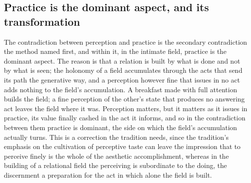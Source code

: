 \subsection{Practice is the dominant aspect, and its transformation}
\label{p22:sub:practice-dominant}

The contradiction between perception and practice is the secondary contradiction the method named first, and within it, in the intimate field, practice is the dominant aspect. The reason is that a relation is built by what is done and not by what is seen; the holonomy of a field accumulates through the acts that send its path the generative way, and a perception however fine that issues in no act adds nothing to the field's accumulation. A breakfast made with full attention builds the field; a fine perception of the other's state that produces no answering act leaves the field where it was. Perception matters, but it matters as it issues in practice, its value finally cashed in the act it informs, and so in the contradiction between them practice is dominant, the side on which the field's accumulation actually turns. This is a correction the tradition needs, since the tradition's emphasis on the cultivation of perceptive taste can leave the impression that to perceive finely is the whole of the aesthetic accomplishment, whereas in the building of a relational field the perceiving is subordinate to the doing, the discernment a preparation for the act in which alone the field is built.


